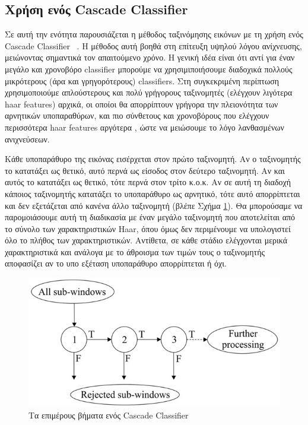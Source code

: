 \subsection{Χρήση ενός Cascade Classifier}

Σε αυτή την ενότητα παρουσιάζεται η μέθοδος ταξινόμησης εικόνων με τη χρήση ενός
Cascade Classifier ~\cite{Viola01rapidobject}. Η μέθοδος αυτή βοηθά στη επίτευξη υψηλού λόγου
ανίχνευσης, μειώνοντας σημαντικά τον απαιτούμενο χρόνο. Η γενική ιδέα είναι ότι αντί για
έναν μεγάλο και χρονοβόρο classifier μπορούμε να χρησιμιποιήσουμε διαδοχικά πολλούς
μικρότερους (άρα και γρηγορότερους) classifiers. Στη συγκεκριμένη περίπτωση χρησιμοποιούμε
απλούστερους και πολύ γρήγορους ταξινομητές (ελέγχουν λιγότερα haar features) αρχικά,
οι οποίοι θα απορρίπτουν γρήγορα την πλειονότητα των αρνητικών υποπαραθύρων,
και πιο σύνθετους και χρονοβόρους που ελέγχουν περισσότερα haar features αργότερα ,
ώστε να μειώσουμε το λόγο λανθασμένων ανιχνεύσεων.

Κάθε υποπαράθυρο της εικόνας εισέρχεται στον πρώτο ταξινομητή. Αν ο ταξινομητής το κατατάξει ως
θετικό, αυτό περνά ως είσοδος στον δεύτερο ταξινομητή. Αν και αυτός το κατατάξει ως θετικό,
τότε περνά στον τρίτο κ.ο.κ. Αν σε αυτή τη διαδοχή κάποιος ταξινομητής κατατάξει το
υποπαράθυρο ως αρνητικό, τότε αυτό απορρίπτεται και δεν εξετάζεται από κανένα άλλο
ταξινομητή (βλέπε Σχήμα \ref{fig:cascadeclassifier}). Θα μπορούσαμε να παρομοιάσουμε
αυτή τη διαδικασία με έναν μεγάλο ταξινομητή που αποτελείται από το σύνολο των χαρακτηριστικών
Haar, όπου όμως δεν περιμένουμε να υπολογιστεί όλο το πλήθος των χαρακτηριστικών.
Αντίθετα, σε κάθε στάδιο ελέγχονται μερικά χαρακτηριστικά και ανάλογα με το άθροισμα
των τιμών τους ο ταξινομητής αποφασίζει αν το υπο εξέταση υποπαράθυρο απορρίπτεται ή όχι.

\begin{figure}[htbp]
  \begin{center}
    \includegraphics[width=0.5\maxwidth]{../figures/cascadeclassifier.png}
    \caption{Τα επιμέρους βήματα ενός Cascade Classifier\label{fig:cascadeclassifier}}
   \end{center}
\end{figure}

